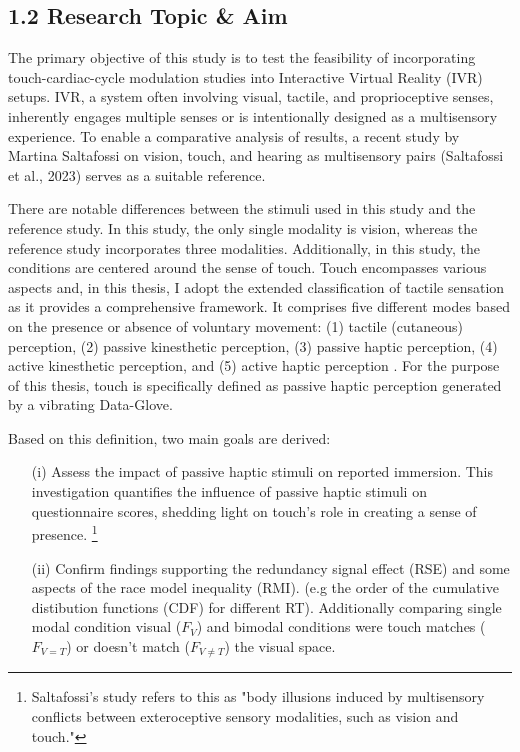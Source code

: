 \documentclass[12pt,oneside,openright]{report}
\begin{document}
\subsection*{1.2 Research Topic \& Aim}

The primary objective of this study is to test the feasibility of incorporating touch-cardiac-cycle modulation studies into Interactive Virtual Reality (IVR) setups. IVR, a system often involving visual, tactile, and proprioceptive senses, inherently engages multiple senses or is intentionally designed as a multisensory experience. To enable a comparative analysis of results, a recent study by Martina Saltafossi on vision, touch, and hearing as multisensory pairs (Saltafossi et al., 2023) serves as a suitable reference.

There are notable differences between the stimuli used in this study and the reference study. In this study, the only single modality is vision, whereas the reference study incorporates three modalities. Additionally, in this study, the conditions are centered around the sense of touch. Touch encompasses various aspects and, in this thesis, I adopt the extended classification of tactile sensation as it provides a comprehensive framework. It comprises five different modes based on the presence or absence of voluntary movement: (1) tactile (cutaneous) perception, (2) passive kinesthetic perception, (3) passive haptic perception, (4) active kinesthetic perception, and (5) active haptic perception \parencite{Healy2003HandbookOP}. For the purpose of this thesis, touch is specifically defined as passive haptic perception generated by a vibrating Data-Glove.

Based on this definition, two main goals are derived:
\begin{itemize}
  \item[(i)] Assess the impact of passive haptic stimuli on reported immersion. This investigation quantifies the influence of passive haptic stimuli on questionnaire scores, shedding light on touch's role in creating a sense of presence. 
  \footnote{Saltafossi's study refers to this as "body illusions induced by multisensory conflicts between exteroceptive sensory modalities, such as vision and touch."}
    
  \item[(ii)] Confirm findings supporting the redundancy signal effect (RSE) and some aspects of the race model inequality (RMI). (e.g the order of the cumulative distibution functions (CDF) for different RT). Additionally comparing single modal condition visual ($F_V$) and bimodal conditions were touch matches ($F_{V=T}$) or doesn’t match ($F_{V \neq T}$) the visual space. 
\end{itemize}
\end{document}
